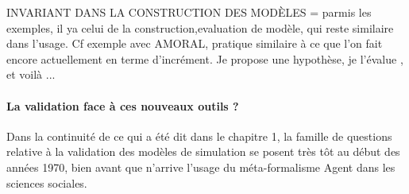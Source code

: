 





INVARIANT DANS LA CONSTRUCTION DES MODÈLES = parmis les exemples, il ya celui de la construction,evaluation de modèle, qui reste similaire dans l'usage. Cf exemple avec AMORAL, pratique similaire à ce que l'on fait encore actuellement en terme d'incrément. Je propose une hypothèse, je l'évalue , et voilà ...

\paragraph{La validation face à ces nouveaux outils ?}
\label{p:validation_nouveaux_outils}

Dans la continuité de ce qui a été dit dans le chapitre 1, la famille de questions relative à la validation des modèles de simulation se posent très tôt au début des années 1970, bien avant que n'arrive l'usage du méta-formalisme Agent dans les sciences sociales.

